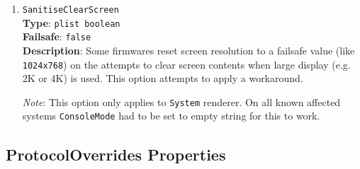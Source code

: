 \documentclass[]{article}
\begin{document}
\begin{enumerate}
\item
  \texttt{SanitiseClearScreen}\\
  \textbf{Type}: \texttt{plist\ boolean}\\
  \textbf{Failsafe}: \texttt{false}\\
  \textbf{Description}: Some firmwares reset screen resolution to a failsafe
  value (like \texttt{1024x768}) on the attempts to clear screen contents
  when large display (e.g. 2K or 4K) is used. This option attempts to apply
  a workaround.

  \emph{Note}: This option only applies to \texttt{System} renderer.
   On all known affected systems \texttt{ConsoleMode} had to be set to
   empty string for this to work.

\end{enumerate}


\subsection{ProtocolOverrides Properties}\label{uefiprotoprops}
\end{document}
